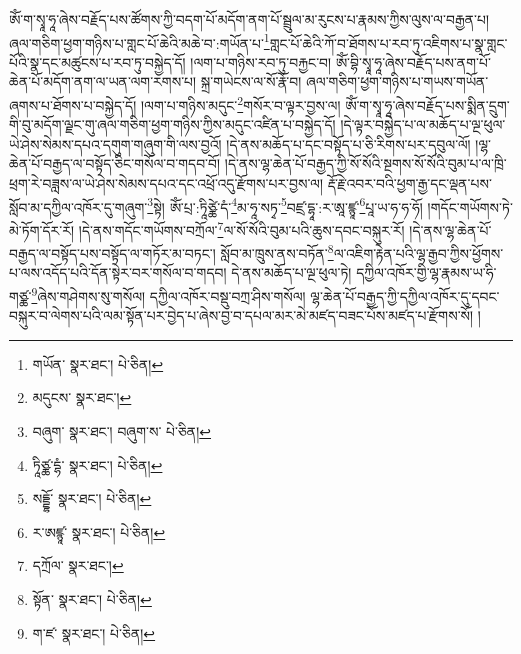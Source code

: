 ཨོཾ་ག་སྭཱ་ཧཱ་ཞེས་བརྗོད་པས་ཚོགས་ཀྱི་བདག་པོ་མདོག་ནག་པོ་སྦྲུལ་མ་རུངས་པ་རྣམས་ཀྱིས་ལུས་ལ་བརྒྱན་པ། ཞལ་གཅིག་ཕྱག་གཉིས་པ་གླང་པོ་ཆེའི་མཆེ་བ་:གཡོན་པ་\footnote{གཡོན་  སྣར་ཐང་།  པེ་ཅིན། }གླང་པོ་ཆེའི་ཀོ་བ་ཐོགས་པ་རབ་ཏུ་འཇིགས་པ་སྣ་གླང་པོའི་སྣ་དང་མཚུངས་པ་རབ་ཏུ་བསྐྱེད་དོ། །ལག་པ་གཉིས་རབ་ཏུ་བརྐྱང་བ། ཨོཾ་བྷི་སྭཱ་ཧཱ་ཞེས་བརྗོད་པས་ནག་པོ་ཆེན་པོ་མདོག་ནག་ལ་ཡན་ལག་རགས་པ། སྐྲ་གཡེངས་ལ་སོ་རྣོ་བ། ཞལ་གཅིག་ཕྱག་གཉིས་པ་གཡས་གཡོན་ཞགས་པ་ཐོགས་པ་བསྐྱེད་དོ། །ལག་པ་གཉིས་མདུང་\footnote{མདུངས་  སྣར་ཐང་། }གསོར་བ་ལྟར་བྱས་ལ། ཨོཾ་ག་སྭཱ་ཧཱ་ཞེས་བརྗོད་པས་སྨིན་དྲུག་གི་བུ་མདོག་ལྗང་གུ་ཞལ་གཅིག་ཕྱག་གཉིས་ཀྱིས་མདུང་འཛིན་པ་བསྐྱེད་དོ། །དེ་ལྟར་བསྐྱེད་པ་ལ་མཆོད་པ་ལྔ་ཕུལ་ཡེ་ཤེས་སེམས་དཔའ་དགུག་གཞུག་གི་ལས་བྱའོ། །དེ་ནས་མཆོད་པ་དང་བསྟོད་པ་ཅི་རིགས་པར་དབུལ་ལོ། །ལྷ་ཆེན་པོ་བརྒྱད་ལ་བསྟོད་ཅིང་གསོལ་བ་གདབ་བོ། །དེ་ནས་ལྷ་ཆེན་པོ་བརྒྱད་ཀྱི་སོ་སོའི་སྔགས་སོ་སོའི་བུམ་པ་ལ་ཁྲི་ཕྲག་རེ་བཟླས་ལ་ཡེ་ཤེས་སེམས་དཔའ་དང་འཕྲོ་འདུ་རྫོགས་པར་བྱས་ལ། རྡོ་རྗེ་འབར་བའི་ཕྱག་རྒྱ་དང་ལྡན་པས་སློབ་མ་དཀྱིལ་འཁོར་དུ་གཞུག་\footnote{བཞུག་  སྣར་ཐང་། བཞུག་ས་  པེ་ཅིན། }སྟེ། ཨོཾ་པྲ་:ཏཱིཙྪེ་དཾ་\footnote{ཏཱིཙྪ་དྷཾ་  སྣར་ཐང་།  པེ་ཅིན། }མ་ཧཱ་སཏྭ་\footnote{སདྡྷོ་  སྣར་ཐང་།  པེ་ཅིན། }བཛྲ་དྷཱ་:ར་ཨཱ་ཛྙཱ་\footnote{ར་ཨཛྙཱ་  སྣར་ཐང་།  པེ་ཅིན། }པཱ་ཡ་ཧ་ཧ་ཧོ། །གདོང་གཡོགས་ཏེ་མེ་ཏོག་དོར་རོ། །དེ་ནས་གདོང་གཡོགས་བཀྲོལ་\footnote{དཀྲོལ་  སྣར་ཐང་། }ལ་སོ་སོའི་བུམ་པའི་ཆུས་དབང་བསྐུར་རོ། །དེ་ནས་ལྷ་ཆེན་པོ་བརྒྱད་ལ་བསྟོད་པས་བསྟོད་ལ་གཏོར་མ་བཏང་། སློབ་མ་ཁྲུས་ནས་བཏོན་\footnote{སྟོན་  སྣར་ཐང་།  པེ་ཅིན། }ལ་འཇིག་རྟེན་པའི་ལྷ་རྒྱབ་ཀྱིས་ཕྱོགས་པ་ལས་འདོད་པའི་དོན་སྟེར་བར་གསོལ་བ་གདབ། དེ་ནས་མཆོད་པ་ལྔ་ཕུལ་ཏེ། དཀྱིལ་འཁོར་གྱི་ལྷ་རྣམས་ཡ་ཧི་གཙྪ་\footnote{ག་ཛ་  སྣར་ཐང་།  པེ་ཅིན། }ཞེས་གཤེགས་སུ་གསོལ། དཀྱིལ་འཁོར་བསྡུ་བཀྲ་ཤིས་གསོལ། ལྷ་ཆེན་པོ་བརྒྱད་ཀྱི་དཀྱིལ་འཁོར་དུ་དབང་བསྐུར་བ་ལེགས་པའི་ལམ་སྟོན་པར་བྱེད་པ་ཞེས་བྱ་བ་དཔལ་མར་མེ་མཛད་བཟང་པོས་མཛད་པ་རྫོགས་སོ། ། 